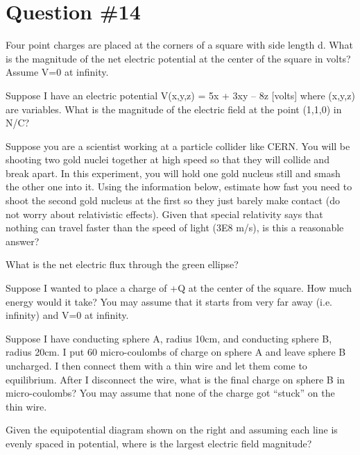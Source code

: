 \documentclass[12pt]{article}
\begin{document}
\section*{Question \#14}
Four point charges are placed at the corners of a square with side length d.  What is the magnitude of the net electric potential at the center of the square in volts?  Assume V=0 at infinity.


Suppose I have an electric potential V(x,y,z) = 5x + 3xy – 8z [volts]  where (x,y,z) are variables.  What is the magnitude of the electric field at the point (1,1,0) in N/C?

Suppose you are a scientist working at a particle collider like CERN.  You will be shooting two gold nuclei together at high speed so that they will collide and break apart.  In this experiment, you will hold one gold nucleus still and smash the other one into it.  Using the information below, estimate how fast you need to shoot the second gold nucleus at the first so they just barely make contact (do not worry about relativistic effects).  Given that special relativity says that nothing can travel faster than the speed of light (3E8 m/s), is this a reasonable answer?

What is the net electric flux through the green ellipse?


Suppose I wanted to place a charge of +Q at the center of the square.  How much energy would it take?  You may assume that it starts from very far away (i.e. infinity) and V=0 at infinity.

Suppose I have conducting sphere A, radius 10cm, and conducting sphere B, radius 20cm.  I put 60 micro-coulombs of charge on sphere A and leave sphere B uncharged.  I then connect them with a thin wire and let them come to equilibrium.  After I disconnect the wire, what is the final charge on sphere B in micro-coulombs?  You may assume that none of the charge got “stuck” on the thin wire.

Given the equipotential diagram shown on the right and assuming each line is evenly spaced in potential, where is the largest electric field magnitude?
\end{document}
